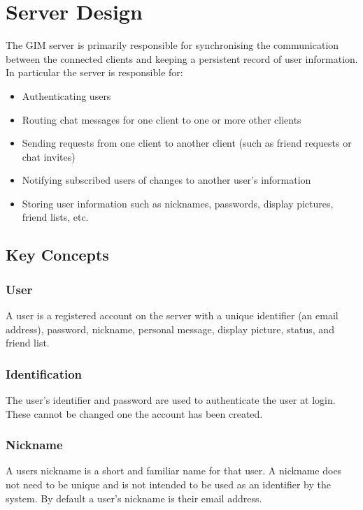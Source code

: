 \section{Server Design}

The GIM server is primarily responsible for synchronising the communication between the connected clients and keeping a persistent record of user information. In particular the server is responsible for:

\begin{itemize}
    \item{Authenticating users}
    \item{Routing chat messages for one client to one or more other clients}
    \item{Sending requests from one client to another client (such as friend requests or chat invites)}
    \item{Notifying subscribed users of changes to another user's information}
    \item{Storing user information such as nicknames, passwords, display pictures, friend lists, etc.}
\end{itemize}

\subsection{Key Concepts}

\subsubsection{User}
A user is a registered account on the server with a unique identifier (an email address), password, nickname, personal message, display picture, status, and friend list. 

\subsubsection{Identification}
The user's identifier and password are used to authenticate the user at login. These cannot be changed one the account has been created. 

\subsubsection{Nickname}
A users nickname is a short and familiar name for that user. A nickname does not need to be unique and is not intended to be used as an identifier by the system. By default a user's nickname is their email address.

